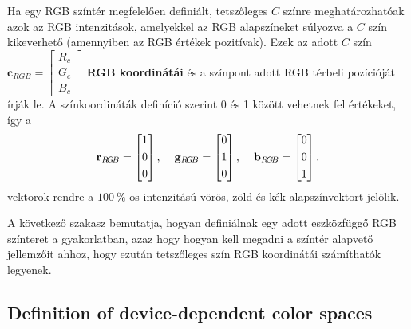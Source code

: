 \vspace{3mm}
Ha egy RGB színtér megfelelően definiált, tetszőleges $C$ színre meghatározhatóak azok az RGB intenzitások, amelyekkel az RGB alapszíneket súlyozva a $C$ szín kikeverhető (amennyiben az RGB értékek pozitívak).
Ezek az adott $C$ szín $\mathbf{c}_{RGB} = \begin{bmatrix}
       R_c \\[0.3em] G_c \\[0.3em] B_c \end{bmatrix}$ \textbf{RGB koordinátái} és a színpont adott RGB térbeli pozícióját írják le.
A színkoordináták definíció szerint 0 és 1 között vehetnek fel értékeket, így a
\begin{equation}
\mathbf{r}_{R\!G\!B} = \begin{bmatrix}
       1 \\[0.3em]
       0 \\[0.3em]
       0 \end{bmatrix}, \hspace{4mm}
\mathbf{g}_{R\!G\!B} = \begin{bmatrix}
       0 \\[0.3em]
       1 \\[0.3em]
       0 \end{bmatrix}, \hspace{4mm}
\mathbf{b}_{R\!G\!B} = \begin{bmatrix}
       0 \\[0.3em]
       0 \\[0.3em]
       1 \end{bmatrix}.
\end{equation}
vektorok rendre a $100~\%$-os intenzitású vörös, zöld és kék alapszínvektort jelölik.

A következő szakasz bemutatja, hogyan definiálnak egy adott eszközfüggő RGB színteret a gyakorlatban, azaz hogy hogyan kell megadni a színtér alapvető jellemzőit ahhoz, hogy ezután tetszőleges szín RGB koordinátái számíthatók legyenek.

\subsection{Definition of device-dependent color spaces}

